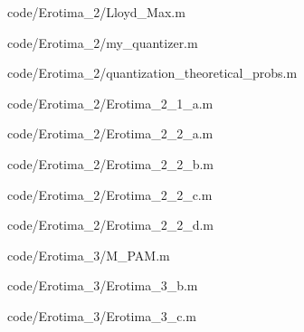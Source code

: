 \documentclass{article}
\begin{document}
    
    {code/Erotima_2/Lloyd_Max.m}
    
    {code/Erotima_2/my_quantizer.m}
    
    {code/Erotima_2/quantization_theoretical_probs.m}
    
    {code/Erotima_2/Erotima_2_1_a.m}
    
    {code/Erotima_2/Erotima_2_2_a.m}
    
    {code/Erotima_2/Erotima_2_2_b.m}
    
    {code/Erotima_2/Erotima_2_2_c.m}
    
    {code/Erotima_2/Erotima_2_2_d.m}
    
    
    {code/Erotima_3/M_PAM.m}
    
    {code/Erotima_3/Erotima_3_b.m}
    
    {code/Erotima_3/Erotima_3_c.m}
\end{document}

